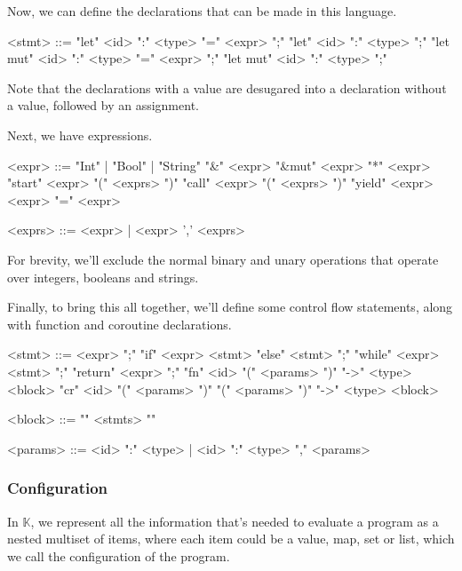 \documentclass[review,twocolumn]{sigplanconf}
\begin{document}
Now, we can define the declarations that can be made in this language.

\begin{grammar}
  <stmt> ::= "let" <id> ":" <type> "=" <expr> ";"
  \alt "let" <id> ":" <type> ";"
  \alt "let mut" <id> ":" <type> "=" <expr> ";"
  \alt "let mut" <id> ":" <type> ";"
\end{grammar}

Note that the declarations with a value are desugared into a declaration without a value, followed by an assignment.

Next, we have expressions.

\begin{grammar}
  <expr> ::= "Int" | "Bool" | "String"
  \alt "&" <expr>
  \alt "&mut" <expr>
  \alt "*" <expr>
  \alt "start" <expr> "(" <exprs> ")"
  \alt "call" <expr> "(" <exprs> ")"
  \alt "yield" <expr>
  \alt <expr> "=" <expr>

  <exprs> ::= <expr> | <expr> ',' <exprs>
\end{grammar}

For brevity, we'll exclude the normal binary and unary operations that operate over integers, booleans and strings.

Finally, to bring this all together, we'll define some control flow statements, along with function and coroutine declarations.

\begin{grammar}
  <stmt> ::= <expr> ";"
  \alt "if" <expr> <stmt> "else" <stmt> ";"
  \alt "while" <expr> <stmt> ";"
  \alt "return" <expr> ";"
  \alt "fn" <id> "(" <params> ")" "->" <type> <block>
  \alt "cr" <id> "(" <params> ")" "(" <params> ")" "->" <type> <block>

  <block> ::= "{" <stmts> "}"

  <params> ::= <id> ":" <type> | <id> ":" <type> "," <params>
\end{grammar}

\vfill\null

\subsubsection{Configuration}

In $\mathbb{K}$, we represent all the information that's needed to evaluate a program as a nested multiset of items, where each item could be a value, map, set or list, which we call the configuration of the program.
\end{document}
